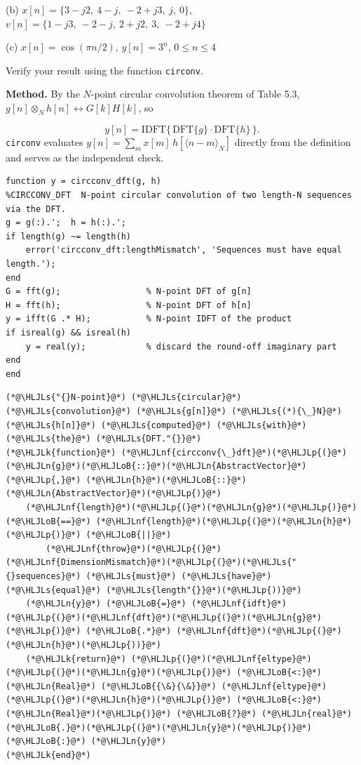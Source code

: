 \documentclass[12pt,a4paper]{article}
\newcommand{\HLJLk}[1]{\textcolor[RGB]{148,91,176}{\textbf{#1}}}
\newcommand{\HLJLn}[1]{#1}
\newcommand{\HLJLnf}[1]{\textcolor[RGB]{66,102,213}{#1}}
\newcommand{\HLJLs}[1]{\textcolor[RGB]{201,61,57}{#1}}
\newcommand{\HLJLoB}[1]{\textcolor[RGB]{102,102,102}{\textbf{#1}}}
\newcommand{\HLJLp}[1]{#1}
\begin{document}
(b) $x[n] = \{3-j2,\ 4-j,\ -2+j3,\ j,\ 0\}$, $v[n] = \{1-j3,\ -2-j,\ 2+j2,\ 3,\ -2+j4\}$

(c) $x[n] = \cos(\pi n/2)$, $y[n] = 3^n$, $0 \le n \le 4$

Verify your result using the function \texttt{circonv}.

\textbf{Method.} By the $N$-point circular convolution theorem of Table 5.3, $g[n] \otimes_N h[n] \longleftrightarrow G[k]H[k]$, so

\[
y[n] = \mathrm{IDFT}\big\{\,\mathrm{DFT}\{g\}\cdot\mathrm{DFT}\{h\}\,\big\}.
\]
\texttt{circonv} evaluates $y[n]=\sum_m x[m]\,h[\langle n-m\rangle_N]$ directly from the definition and serves as the independent check.

\begin{verbatim}
function y = circconv_dft(g, h)
%CIRCCONV_DFT  N-point circular convolution of two length-N sequences via the DFT.
g = g(:).';  h = h(:).';
if length(g) ~= length(h)
    error('circconv_dft:lengthMismatch', 'Sequences must have equal length.');
end
G = fft(g);                 % N-point DFT of g[n]
H = fft(h);                 % N-point DFT of h[n]
y = ifft(G .* H);           % N-point IDFT of the product
if isreal(g) && isreal(h)
    y = real(y);            % discard the round-off imaginary part
end
end
\end{verbatim}

\begin{lstlisting}
(*@\HLJLs{"{}N-point}@*) (*@\HLJLs{circular}@*) (*@\HLJLs{convolution}@*) (*@\HLJLs{g[n]}@*) (*@\HLJLs{(*){\_}N}@*) (*@\HLJLs{h[n]}@*) (*@\HLJLs{computed}@*) (*@\HLJLs{with}@*) (*@\HLJLs{the}@*) (*@\HLJLs{DFT."{}}@*)
(*@\HLJLk{function}@*) (*@\HLJLnf{circconv{\_}dft}@*)(*@\HLJLp{(}@*)(*@\HLJLn{g}@*)(*@\HLJLoB{::}@*)(*@\HLJLn{AbstractVector}@*)(*@\HLJLp{,}@*) (*@\HLJLn{h}@*)(*@\HLJLoB{::}@*)(*@\HLJLn{AbstractVector}@*)(*@\HLJLp{)}@*)
    (*@\HLJLnf{length}@*)(*@\HLJLp{(}@*)(*@\HLJLn{g}@*)(*@\HLJLp{)}@*) (*@\HLJLoB{==}@*) (*@\HLJLnf{length}@*)(*@\HLJLp{(}@*)(*@\HLJLn{h}@*)(*@\HLJLp{)}@*) (*@\HLJLoB{||}@*)
        (*@\HLJLnf{throw}@*)(*@\HLJLp{(}@*)(*@\HLJLnf{DimensionMismatch}@*)(*@\HLJLp{(}@*)(*@\HLJLs{"{}sequences}@*) (*@\HLJLs{must}@*) (*@\HLJLs{have}@*) (*@\HLJLs{equal}@*) (*@\HLJLs{length"{}}@*)(*@\HLJLp{))}@*)
    (*@\HLJLn{y}@*) (*@\HLJLoB{=}@*) (*@\HLJLnf{idft}@*)(*@\HLJLp{(}@*)(*@\HLJLnf{dft}@*)(*@\HLJLp{(}@*)(*@\HLJLn{g}@*)(*@\HLJLp{)}@*) (*@\HLJLoB{.*}@*) (*@\HLJLnf{dft}@*)(*@\HLJLp{(}@*)(*@\HLJLn{h}@*)(*@\HLJLp{))}@*)
    (*@\HLJLk{return}@*) (*@\HLJLp{(}@*)(*@\HLJLnf{eltype}@*)(*@\HLJLp{(}@*)(*@\HLJLn{g}@*)(*@\HLJLp{)}@*) (*@\HLJLoB{<:}@*) (*@\HLJLn{Real}@*) (*@\HLJLoB{{\&}{\&}}@*) (*@\HLJLnf{eltype}@*)(*@\HLJLp{(}@*)(*@\HLJLn{h}@*)(*@\HLJLp{)}@*) (*@\HLJLoB{<:}@*) (*@\HLJLn{Real}@*)(*@\HLJLp{)}@*) (*@\HLJLoB{?}@*) (*@\HLJLn{real}@*)(*@\HLJLoB{.}@*)(*@\HLJLp{(}@*)(*@\HLJLn{y}@*)(*@\HLJLp{)}@*) (*@\HLJLoB{:}@*) (*@\HLJLn{y}@*)
(*@\HLJLk{end}@*)
\end{lstlisting}
\end{document}
